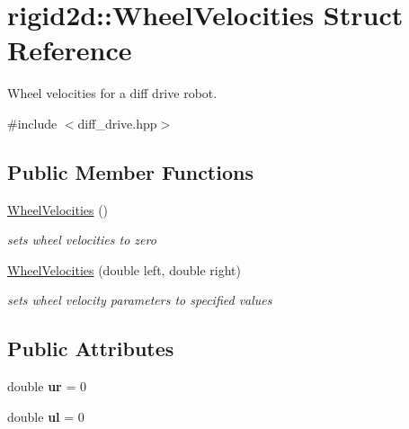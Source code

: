 \hypertarget{structrigid2d_1_1WheelVelocities}{}\section{rigid2d\+:\+:Wheel\+Velocities Struct Reference}
\label{structrigid2d_1_1WheelVelocities}


Wheel velocities for a diff drive robot.  




{\ttfamily \#include $<$diff\+\_\+drive.\+hpp$>$}

\subsection*{Public Member Functions}
\begin{DoxyCompactItemize}
\item 
\mbox{\label{structrigid2d_1_1WheelVelocities_a406eb6ddee2a8cfff2e88359462cd1c3}} 
\hyperlink{structrigid2d_1_1WheelVelocities_a406eb6ddee2a8cfff2e88359462cd1c3}{Wheel\+Velocities} ()
\begin{DoxyCompactList}\small\item\em sets wheel velocities to zero \end{DoxyCompactList}\item 
\mbox{\label{structrigid2d_1_1WheelVelocities_a580b7a8bfb68b61d5423adc3de5de4a9}} 
\hyperlink{structrigid2d_1_1WheelVelocities_a580b7a8bfb68b61d5423adc3de5de4a9}{Wheel\+Velocities} (double left, double right)
\begin{DoxyCompactList}\small\item\em sets wheel velocity parameters to specified values \end{DoxyCompactList}\end{DoxyCompactItemize}
\subsection*{Public Attributes}
\begin{DoxyCompactItemize}
\item 
\mbox{\label{structrigid2d_1_1WheelVelocities_a647f6d1dd95af0323780c8b7d639ccf3}} 
double {\bfseries ur} = 0
\item 
\mbox{\label{structrigid2d_1_1WheelVelocities_a7e2524297e82e99d40e575633184d060}} 
double {\bfseries ul} = 0
\end{DoxyCompactItemize}


